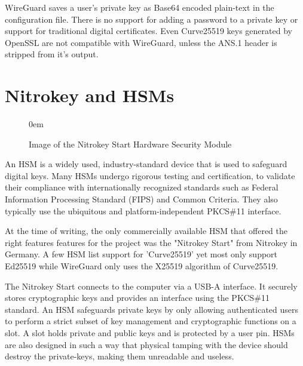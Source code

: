 \documentclass [11pt, proquest] {uwthesis}[2020/02/24]
\begin{document}
WireGuard saves a user's private key as Base64 encoded plain-text in the configuration file. There is no support for adding a password to a private key or support for traditional digital certificates. Even Curve25519 keys generated by OpenSSL are not compatible with WireGuard, unless the ANS.1 header is stripped from it's output.
\section{Nitrokey and HSMs}
\begin{figure}
\itemsep0em 
\caption{Image of the Nitrokey Start Hardware Security Module}
\label{img:nitrokey}
\end{figure}
An HSM is a widely used, industry-standard device that is used to safeguard digital keys. Many HSMs undergo rigorous testing and certification, to validate their compliance with internationally recognized standards such as Federal Information Processing Standard (FIPS) and Common Criteria. They also typically use the ubiquitous and platform-independent PKCS\#11 interface. 

At the time of writing, the only commercially available HSM that offered the right features features for the project was the "Nitrokey Start" from Nitrokey in Germany\cite{noauthor_nitrokey_2022}. A few HSM list support for 'Curve25519' yet most only support Ed25519 while WireGuard only uses the X25519 algorithm of Curve25519.

The Nitrokey Start connects to the computer via a USB-A interface. It securely stores cryptographic keys and provides an interface using the PKCS\#11 standard.
An HSM safeguards private keys by only allowing authenticated users to perform a strict subset of key management and cryptographic functions on a slot. A slot holds private and public keys and is protected by a user pin. HSMs are also designed in such a way that physical tamping with the device should destroy the private-keys, making them unreadable and useless. 
\end{document}
